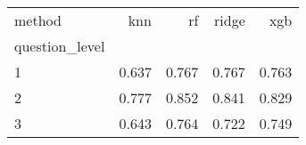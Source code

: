 \begin{tabular}{lrrrr}
\toprule
method & knn & rf & ridge & xgb \\
question_level &  &  &  &  \\
\midrule
1 & 0.637 & 0.767 & 0.767 & 0.763 \\
2 & 0.777 & 0.852 & 0.841 & 0.829 \\
3 & 0.643 & 0.764 & 0.722 & 0.749 \\
\bottomrule
\end{tabular}
